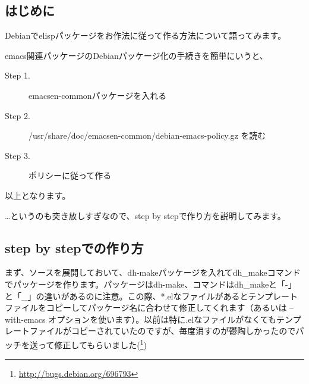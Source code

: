 \documentclass[mingoth,a4paper]{jsarticle}
\begin{document}


\subsection{はじめに}

 Debianでelispパッケージをお作法に従って作る方法について語ってみます。

 emacs関連パッケージのDebianパッケージ化の手続きを簡単にいうと、

\begin{description}
\item [Step 1.] emacsen-commonパッケージを入れる
\item [Step 2.] /usr/share/doc/emacsen-common/debian-emacs-policy.gz を読む
\item [Step 3.] ポリシーに従って作る
\end{description}

以上となります。

…というのも突き放しすぎなので、step by stepで作り方を説明してみます。

\subsection{step by stepでの作り方}

 まず、ソースを展開しておいて、dh-makeパッケージを入れてdh\_makeコマンドでパッケージを作ります。パッケージはdh-make、コマンドはdh\_makeと「-」と「\_」の違いがあるのに注意。この際、*.elなファイルがあるとテンプレートファイルをコピーしてパッケージ名に合わせて修正してくれます（あるいは --with-emacs オプションを使います）。以前は特に.elなファイルがなくてもテンプレートファイルがコピーされていたのですが、毎度消すのが鬱陶しかったのでパッチを送って修正してもらいました(\footnote{\url{http://bugs.debian.org/696793}})
\end{document}
